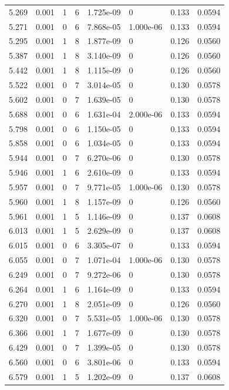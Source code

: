 \documentclass[preview]{standalone}
\begin{document}
{{{\begin{tabular}{L{1.2cm}C{1.2cm} C{0.3cm}C{0.5cm} C{1.4cm}C{1.4cm} C{1.4cm}C{1.4cm}}
  5.269  &  0.001  & 1     &  6 &  1.725e-09  & 0  & 0.133 &  0.0594   \\ 
  5.271  &  0.001  & 0     &  6 &  7.868e-05  & 1.000e-06  & 0.133 &  0.0594   \\ 
  5.295  &  0.001  & 1     &  8 &  1.877e-09  & 0  & 0.126 &  0.0560   \\ 
  5.387  &  0.001  & 1     &  8 &  3.140e-09  & 0  & 0.126 &  0.0560   \\ 
  5.442  &  0.001  & 1     &  8 &  1.115e-09  & 0  & 0.126 &  0.0560   \\ 
  5.522  &  0.001  & 0     &  7 &  3.014e-05  & 0  & 0.130 &  0.0578   \\ 
  5.602  &  0.001  & 0     &  7 &  1.639e-05  & 0  & 0.130 &  0.0578   \\ 
  5.688  &  0.001  & 0     &  6 &  1.631e-04  & 2.000e-06  & 0.133 &  0.0594   \\ 
  5.798  &  0.001  & 0     &  6 &  1.150e-05  & 0  & 0.133 &  0.0594   \\ 
  5.858  &  0.001  & 0     &  6 &  1.034e-05  & 0  & 0.133 &  0.0594   \\ 
  5.944  &  0.001  & 0     &  7 &  6.270e-06  & 0  & 0.130 &  0.0578   \\ 
  5.946  &  0.001  & 1     &  6 &  2.610e-09  & 0  & 0.133 &  0.0594   \\ 
  5.957  &  0.001  & 0     &  7 &  9.771e-05  & 1.000e-06  & 0.130 &  0.0578   \\ 
  5.960  &  0.001  & 1     &  8 &  1.157e-09  & 0  & 0.126 &  0.0560   \\ 
  5.961  &  0.001  & 1     &  5 &  1.146e-09  & 0  & 0.137 &  0.0608   \\ 
  6.013  &  0.001  & 1     &  5 &  2.629e-09  & 0  & 0.137 &  0.0608   \\ 
  6.015  &  0.001  & 0     &  6 &  3.305e-07  & 0  & 0.133 &  0.0594   \\ 
  6.055  &  0.001  & 0     &  7 &  1.071e-04  & 1.000e-06  & 0.130 &  0.0578   \\ 
  6.249  &  0.001  & 0     &  7 &  9.272e-06  & 0  & 0.130 &  0.0578   \\ 
  6.264  &  0.001  & 1     &  6 &  1.164e-09  & 0  & 0.133 &  0.0594   \\ 
  6.270  &  0.001  & 1     &  8 &  2.051e-09  & 0  & 0.126 &  0.0560   \\ 
  6.320  &  0.001  & 0     &  7 &  5.531e-05  & 1.000e-06  & 0.130 &  0.0578   \\ 
  6.366  &  0.001  & 1     &  7 &  1.677e-09  & 0  & 0.130 &  0.0578   \\ 
  6.429  &  0.001  & 0     &  7 &  1.399e-05  & 0  & 0.130 &  0.0578   \\ 
  6.560  &  0.001  & 0     &  6 &  3.801e-06  & 0  & 0.133 &  0.0594   \\ 
  6.579  &  0.001  & 1     &  5 &  1.202e-09  & 0  & 0.137 &  0.0608   \\ 
\hline 
\end{tabular} 

}}}
\end{document}
